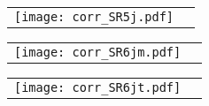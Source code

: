 \documentclass[landscape,12pt,a4paper]{article}
\begin{document}
\begin{figure}[h]\begin{center}\begin{tabular}{cc}\texttt{[image: corr\_SR5j.pdf]}\end{tabular}\end{center}\end{figure}
\begin{figure}[h]\begin{center}\begin{tabular}{cc}\texttt{[image: corr\_SR6jm.pdf]}\end{tabular}\end{center}\end{figure}
\begin{figure}[h]\begin{center}\begin{tabular}{cc}\texttt{[image: corr\_SR6jt.pdf]}\end{tabular}\end{center}\end{figure}
\end{document}

